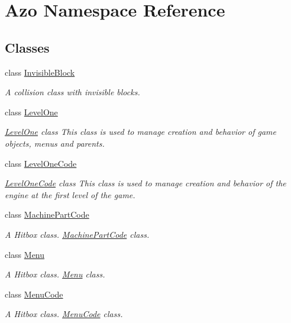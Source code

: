 \hypertarget{namespace_azo}{}\section{Azo Namespace Reference}
\label{namespace_azo}
\subsection*{Classes}
\begin{DoxyCompactItemize}
\item 
class \hyperlink{class_azo_1_1_invisible_block}{Invisible\+Block}
\begin{DoxyCompactList}\small\item\em A collision class with invisible blocks. \end{DoxyCompactList}\item 
class \hyperlink{class_azo_1_1_level_one}{Level\+One}
\begin{DoxyCompactList}\small\item\em \hyperlink{class_azo_1_1_level_one}{Level\+One} class This class is used to manage creation and behavior of game objects, menus and parents. \end{DoxyCompactList}\item 
class \hyperlink{class_azo_1_1_level_one_code}{Level\+One\+Code}
\begin{DoxyCompactList}\small\item\em \hyperlink{class_azo_1_1_level_one_code}{Level\+One\+Code} class This class is used to manage creation and behavior of the engine at the first level of the game. \end{DoxyCompactList}\item 
class \hyperlink{class_azo_1_1_machine_part_code}{Machine\+Part\+Code}
\begin{DoxyCompactList}\small\item\em A Hitbox class. \hyperlink{class_azo_1_1_machine_part_code}{Machine\+Part\+Code} class. \end{DoxyCompactList}\item 
class \hyperlink{class_azo_1_1_menu}{Menu}
\begin{DoxyCompactList}\small\item\em A Hitbox class. \hyperlink{class_azo_1_1_menu}{Menu} class. \end{DoxyCompactList}\item 
class \hyperlink{class_azo_1_1_menu_code}{Menu\+Code}
\begin{DoxyCompactList}\small\item\em A Hitbox class. \hyperlink{class_azo_1_1_menu_code}{Menu\+Code} class. \end{DoxyCompactList}\item 

\end{DoxyCompactItemize}
